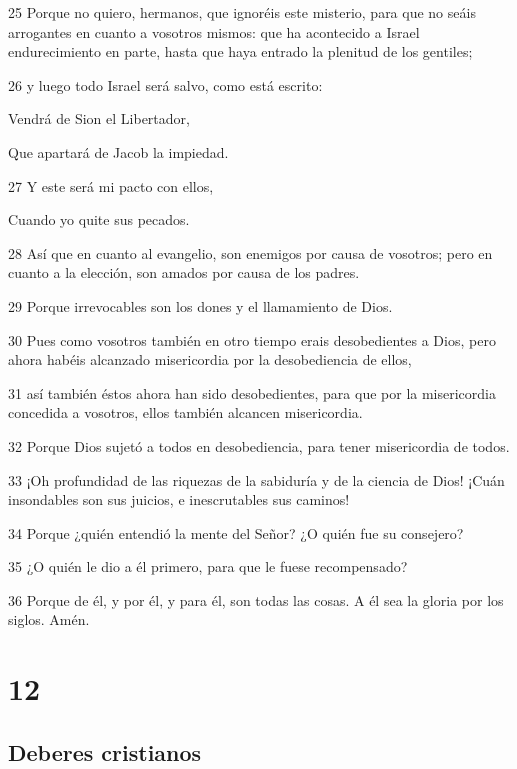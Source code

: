 \par 25 Porque no quiero, hermanos, que ignoréis este misterio, para que no seáis arrogantes en cuanto a vosotros mismos: que ha acontecido a Israel endurecimiento en parte, hasta que haya entrado la plenitud de los gentiles;
\par 26 y luego todo Israel será salvo, como está escrito:
\par Vendrá de Sion el Libertador,
\par Que apartará de Jacob la impiedad.
\par 27 Y este será mi pacto con ellos,
\par Cuando yo quite sus pecados.
\par 28 Así que en cuanto al evangelio, son enemigos por causa de vosotros; pero en cuanto a la elección, son amados por causa de los padres.
\par 29 Porque irrevocables son los dones y el llamamiento de Dios.
\par 30 Pues como vosotros también en otro tiempo erais desobedientes a Dios, pero ahora habéis alcanzado misericordia por la desobediencia de ellos,
\par 31 así también éstos ahora han sido desobedientes, para que por la misericordia concedida a vosotros, ellos también alcancen misericordia.
\par 32 Porque Dios sujetó a todos en desobediencia, para tener misericordia de todos.
\par 33 ¡Oh profundidad de las riquezas de la sabiduría y de la ciencia de Dios! ¡Cuán insondables son sus juicios, e inescrutables sus caminos!
\par 34 Porque ¿quién entendió la mente del Señor? ¿O quién fue su consejero?
\par 35 ¿O quién le dio a él primero, para que le fuese recompensado?
\par 36 Porque de él, y por él, y para él, son todas las cosas. A él sea la gloria por los siglos. Amén.

\chapter{12}

\section*{Deberes cristianos}

